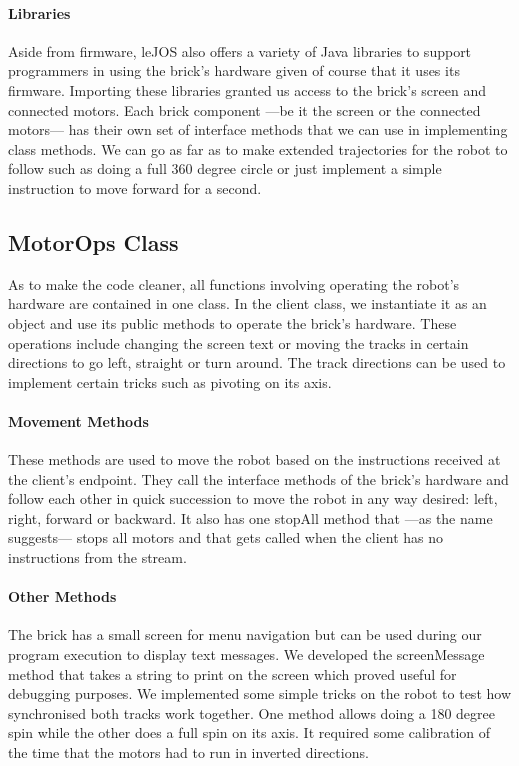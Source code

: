 \paragraph{Libraries}
Aside from firmware, leJOS also offers a variety of Java libraries to support programmers in using the brick's hardware given of course that it uses its firmware. Importing these libraries granted us access to the brick's screen and connected motors. Each brick component ---be it the screen or the connected motors--- has their own set of interface methods that we can use in implementing class methods. We can go as far as to make extended trajectories for the robot to follow such as doing a full 360 degree circle or just implement a simple instruction to move forward for a second.

\subsection{MotorOps Class}
As to make the code cleaner, all functions involving operating the robot's hardware are contained in one class. In the client class, we instantiate it as an object and use its public methods to operate the brick's hardware. These operations include changing the screen text or moving the tracks in certain directions to go left, straight or turn around. The track directions can be used to implement certain tricks such as pivoting on its axis.

\paragraph{Movement Methods}
These methods are used to move the robot based on the instructions received at the client's endpoint. They call the interface methods of the brick's hardware and follow each other in quick succession to move the robot in any way desired: left, right, forward or backward. It also has one stopAll method that ---as the name suggests--- stops all motors and that gets called when the client has no instructions from the stream. 

\paragraph{Other Methods}
The brick has a small screen for menu navigation but can be used during our program execution to display text messages. We developed the screenMessage method that takes a string to print on the screen which proved useful for debugging purposes.
We implemented some simple tricks on the robot to test how synchronised both tracks work together. One method allows doing a 180 degree spin while the other does a full spin on its axis. It required some calibration of the time that the motors had to run in inverted directions.

